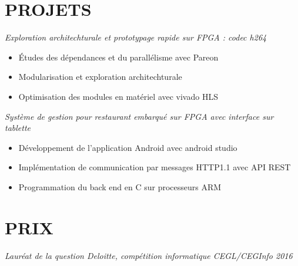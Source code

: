 \documentclass[margin, 10pt]{res} %
\begin{document}
\begin{resume}
 
\section{PROJETS}

{\sl Exploration architechturale et prototypage rapide sur FPGA : codec h264}
\begin{itemize} \itemsep -2pt %
\item \'Etudes des d\'ependances et du parall\'elisme avec Pareon
\item Modularisation et exploration architechturale
\item Optimisation des modules en mat\'eriel avec vivado HLS
\end{itemize} 

{\sl Syst\`eme de gestion pour restaurant embarqu\'e sur FPGA avec interface sur tablette}
\begin{itemize} \itemsep -2pt %
\item D\'eveloppement de l'application Android avec android studio
\item  Impl\'ementation de communication par messages HTTP1.1 avec API REST
\item  Programmation du back end en C sur processeurs ARM
\end{itemize} 

 
\section{PRIX}

{\sl Laur\'eat de la question Deloitte, comp\'etition informatique CEGL/CEGInfo 2016}

\end{resume}
\end{document}
